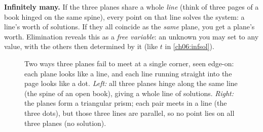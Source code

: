 \textbf{Infinitely many.} If the three planes share a whole \emph{line}
(think of three pages of a book hinged on the same spine), every point on
that line solves the system: a line's worth of solutions. If they all
coincide as the \emph{same} plane, you get a plane's worth. Elimination
reveals this as a \emph{free variable}: an unknown you may set to any
value, with the others then determined by it (like $t$ in
\eqref{ch06:infsol}).

\begin{figure}[H]
\centering
{}
\caption{Two ways three planes fail to meet at a single corner, seen
edge-on: each plane looks like a line, and each line running straight into
the page looks like a dot. \emph{Left:} all three planes hinge along the
same line (the spine of an open book), giving a whole line of solutions.
\emph{Right:} the planes form a triangular prism; each pair meets in a line
(the three dots), but those three lines are parallel, so no point lies on
all three planes (no solution).}
\label{ch06:spine}
\end{figure}

